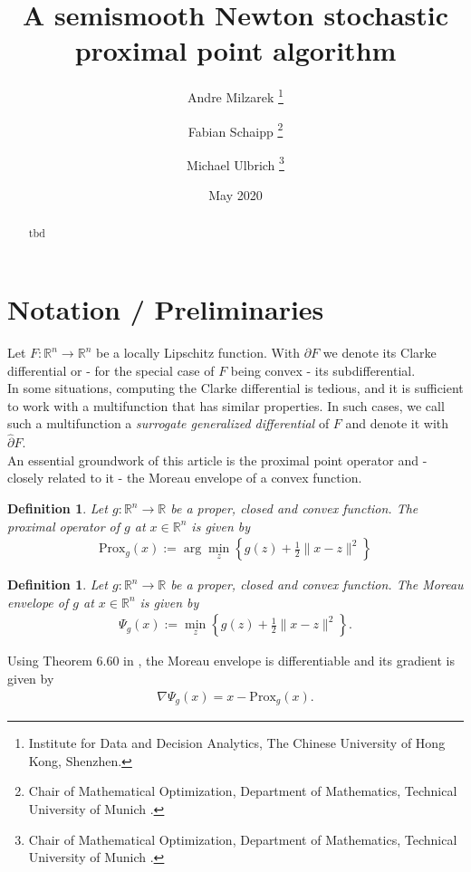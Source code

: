 \documentclass[12pt,a4paper,twoside]{article}
\title{A semismooth Newton stochastic proximal point algorithm}
\date{May 2020}
\author{Andre Milzarek \thanks{Institute for Data and Decision Analytics, The Chinese University of Hong Kong, Shenzhen. }
	\and Fabian Schaipp \thanks{Chair of Mathematical Optimization, Department of Mathematics, Technical University of Munich
		.}
	\and Michael Ulbrich \thanks{Chair of Mathematical Optimization, Department of Mathematics, Technical University of Munich
		.}
	}
\theoremstyle{plain}
\newtheorem{defn}[thm]{Definition}
\theoremstyle{note}
\numberwithin{thm}{section}
\newcommand{\prox}[2]{\text{Prox}_{#1}\left(#2\right)}
\newcommand{\onehalf}{\frac{1}{2}}
\begin{document}
	\maketitle
	\begin{abstract}
		tbd
	\end{abstract}


\tableofcontents	
\clearpage

\section{Notation / Preliminaries}
	Let $F:\mathbb{R}^n \to \mathbb{R}^n$ be a locally Lipschitz function. With $\partial F$ we denote its Clarke differential or - for the special case of $F$ being convex - its subdifferential.\\
	In some situations, computing the Clarke differential is tedious, and it is sufficient to work with a multifunction that has similar properties. In such cases, we call such a multifunction a \textit{surrogate generalized differential} of $F$ and denote it with $\hat{\partial} F$.\\
	
	An essential groundwork of this article is the proximal point operator and - closely related to it - the Moreau envelope of a convex function.
	\begin{defn}
		Let $g: \mathbb{R}^n \to \mathbb{R}$ be a proper, closed and convex function. The proximal operator of $g$ at $x\in \mathbb{R}^n$ is given by
		\begin{align*}
			\prox{g}{x} := \arg \min_z \left\{g(z) + \onehalf \|x-z\|^2 \right\}
		\end{align*}
	\end{defn}

	\begin{defn}
	Let $g: \mathbb{R}^n \to \mathbb{R}$ be a proper, closed and convex function. The Moreau envelope of $g$ at $x\in \mathbb{R}^n$ is given by
	\begin{align*}
	\Psi_g(x) := \min_z \left\{g(z) + \onehalf \|x-z\|^2 \right\}.
	\end{align*}
	\end{defn}
	
	Using Theorem 6.60 in \cite{Beck2017}, the Moreau envelope is differentiable and its gradient is given by 
	\begin{align}
		\label{eqn:moreau_gradient}
		\nabla \Psi_g(x) = x - \prox{g}{x}.
	\end{align}
	
\end{document}
